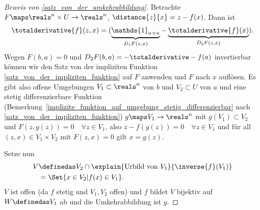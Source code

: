 \begin{proof}[Beweis von \ref{satz_von_der_umkehrabbildung}]
  Betrachte \( F\maps \reals^n\times U\to \reals^n \), \( \distance{z}{x}=z-f(x) \). Dann ist 
  \begin{equation*}
    \totalderivative{f}(z,x)=(\underbrace{\mathds{1}_{n\times n}}_{D_1 F(z,x)}-\underbrace{\totalderivative{f}(x)}_{D_2 F(z,x)}).
  \end{equation*} 
  Wegen \( F(b,a)=0 \) und \( D_2 F(b,a)=-\totalderivative-{f}(a) \) invertierbar können wir den Satz von der impliziten Funktion \ref{satz_von_der_impliziten_funktion} auf \( F \) anwenden und \( F \) nach \( x \) auflösen. Es gibt also offene Umgebungen \( V_1\subset \reals^n \) von \( b \) und \( V_2\subset U \) von \( a \) und eine stetig differenzierbare Funktion (\vgl Bemerkung~\ref{implizite_funktion_auf_umgebung_stetig_differenzierbar} nach    \ref{satz_von_der_impliziten_funktion}) \( g\maps V_1\to \reals^n \) mit \( g(V_1)\subset V_2 \) und \( F(z,g(z))=0\quad \forall z\in V_1 \), also \( z-f(g(z))=0 \quad \forall z\in V_1 \) und für all \( (z,x)\in V_1\times V_2 \) mit \( F(z,x)=0 \) gilt \( x=g(z) \).

  Setze nun
  \begin{gather*}
    V \begin{aligned}[t]
      &\definedas V_2\cap \explain{\text{Urbild von \( V_1 \)}}{\inverse{f}(V_1)}\\
      &=\Set{x\in V_2|f(x)\in V_1}.
    \end{aligned}
  \end{gather*}
  \( V \) ist offen (da \( f \) stetig und \( V_1,V_2 \) offen) und \( f \) bildet \( V \) bijektiv auf \( W\definedas V_1 \) ab und die Umkehrabbildung ist \( g \).
\end{proof}

